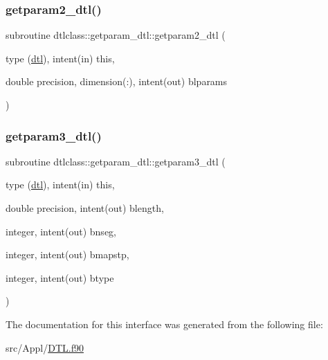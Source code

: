\mbox{\label{interfacedtlclass_1_1getparam__dtl_a2ef7f4b6d8987a7cdf38e600dbda2f56}} 
\subsubsection{\texorpdfstring{getparam2\_dtl()}{getparam2\_dtl()}}
{\footnotesize\ttfamily subroutine dtlclass\+::getparam\+\_\+dtl\+::getparam2\+\_\+dtl (\begin{DoxyParamCaption}\item[{type (\mbox{\hyperlink{namespacedtlclass_structdtlclass_1_1dtl}{dtl}}), intent(in)}]{this,  }\item[{double precision, dimension(\+:), intent(out)}]{blparams }\end{DoxyParamCaption})}

\mbox{\label{interfacedtlclass_1_1getparam__dtl_a9b40f49372f1eaec16eb1248b3d44e8f}} 
\subsubsection{\texorpdfstring{getparam3\_dtl()}{getparam3\_dtl()}}
{\footnotesize\ttfamily subroutine dtlclass\+::getparam\+\_\+dtl\+::getparam3\+\_\+dtl (\begin{DoxyParamCaption}\item[{type (\mbox{\hyperlink{namespacedtlclass_structdtlclass_1_1dtl}{dtl}}), intent(in)}]{this,  }\item[{double precision, intent(out)}]{blength,  }\item[{integer, intent(out)}]{bnseg,  }\item[{integer, intent(out)}]{bmapstp,  }\item[{integer, intent(out)}]{btype }\end{DoxyParamCaption})}



The documentation for this interface was generated from the following file\+:\begin{DoxyCompactItemize}
\item 
src/\+Appl/\mbox{\hyperlink{_d_t_l_8f90}{D\+T\+L.\+f90}}\end{DoxyCompactItemize}
